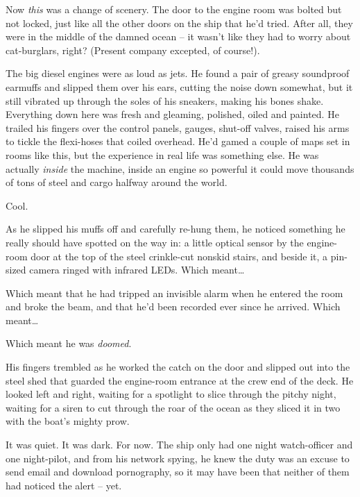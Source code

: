 Now \emph{this} was a change of scenery. The door to the engine
room was bolted but not locked, just like all the other doors on
the ship that he'd tried. After all, they were in the middle of the
damned ocean -- it wasn't like they had to worry about
cat-burglars, right? (Present company excepted, of course!).

The big diesel engines were as loud as jets. He found a pair of
greasy soundproof earmuffs and slipped them over his ears, cutting
the noise down somewhat, but it still vibrated up through the soles
of his sneakers, making his bones shake. Everything down here was
fresh and gleaming, polished, oiled and painted. He trailed his
fingers over the control panels, gauges, shut-off valves, raised
his arms to tickle the flexi-hoses that coiled overhead. He'd gamed
a couple of maps set in rooms like this, but the experience in real
life was something else. He was actually \emph{inside} the machine,
inside an engine so powerful it could move thousands of tons of
steel and cargo halfway around the world.

Cool.

As he slipped his muffs off and carefully re-hung them, he noticed
something he really should have spotted on the way in: a little
optical sensor by the engine-room door at the top of the steel
crinkle-cut nonskid stairs, and beside it, a pin-sized camera
ringed with infrared LEDs. Which meant\ldots{}

Which meant that he had tripped an invisible alarm when he entered
the room and broke the beam, and that he'd been recorded ever since
he arrived. Which meant\ldots{}

Which meant he was \emph{doomed}.

His fingers trembled as he worked the catch on the door and slipped
out into the steel shed that guarded the engine-room entrance at
the crew end of the deck. He looked left and right, waiting for a
spotlight to slice through the pitchy night, waiting for a siren to
cut through the roar of the ocean as they sliced it in two with the
boat's mighty prow.

It was quiet. It was dark. For now. The ship only had one night
watch-officer and one night-pilot, and from his network spying, he
knew the duty was an excuse to send email and download pornography,
so it may have been that neither of them had noticed the alert --
yet.

